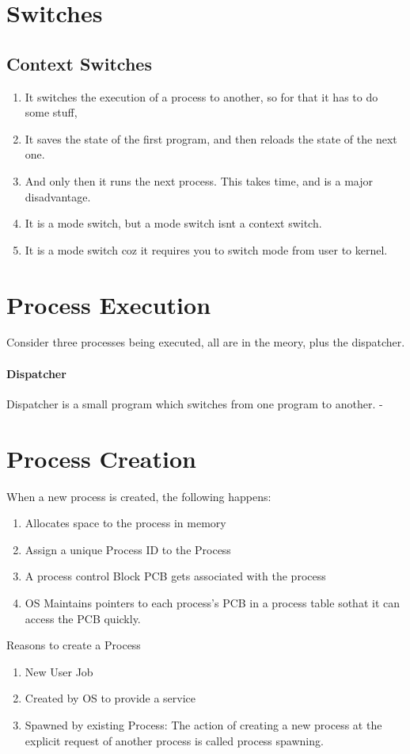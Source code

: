 \documentclass[11pt]{article}
\begin{document}
\section{Switches}
\subsection{Context Switches}
\begin{enumerate}
    \item It switches the execution of a process to another, so for that it has to do some stuff, 
    \item It saves the state of the first program, and then reloads the state of the next one. 
    \item And only then it runs the next process. This takes time, and is a major disadvantage. 
    \item It is a mode switch, but a mode switch isnt a context switch. 
    \item It is a mode switch coz it requires you to switch mode from user to kernel. 
\end{enumerate}

\section{Process Execution}
Consider three processes being executed, all are in the meory, plus the dispatcher. 
\paragraph{Dispatcher}
Dispatcher is a small program which switches from one program to another. -

\section{Process Creation}
When a new process is created, the following happens:
\begin{enumerate}
    \item Allocates space to the process in memory
    \item Assign a unique Process ID to the Process
    \item A process control Block PCB gets associated with the process
    \item OS Maintains pointers to each process's PCB in a process table sothat it can access the PCB quickly. 
\end{enumerate}

Reasons to create a Process
\begin{enumerate}
    \item New User Job
    \item Created by OS to provide a service
    \item Spawned by existing Process: The action of creating a new process at the explicit request of another process is called process spawning.
\end{enumerate}
\end{document}
